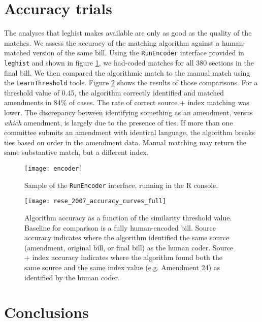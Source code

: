 \documentclass[11pt]{article}
\begin{document}
\section{Accuracy trials}
\label{sec:accuracy-trials}

The analyses that leghist makes available are only as good as the
quality of the matches. We assess the accuracy of the matching
algorithm against a human-matched version of the same bill. Using the 
\texttt{RunEncoder} interface provided in \texttt{leghist} and shown
in figure \ref{fig:encoder-interface}, we had-coded matches for all
380 sections in the final bill. We then compared the algorithmic match
to the manual match using the \texttt{LearnThreshold}
tools. Figure \ref{fig:rese-accuracy-test} shows the results of those
comparisons. For a threshold value of 0.45, the algorithm correctly
identified and matched amendments in 84\% of cases. The rate of
correct source + index matching was lower. The discrepancy between
identifying something as an amendment, versus \textit{which}
amendment, is largely due to the presence of ties. If
more than one committee submits an amendment with identical language,
the algorithm breaks ties based on order in the amendment data. Manual
matching may return the same substantive match, but a different
index.


\begin{figure}[ht]
  \centering
  \texttt{[image: encoder]}
  \caption{Sample of the \texttt{RunEncoder} interface, running in the R console. }
  \label{fig:encoder-interface}
\end{figure}

\begin{figure}[ht]
  \centering
  \texttt{[image: rese\_2007\_accuracy\_curves\_full]}
  \caption{Algorithm accuracy as a function of the similarity threshold value. Baseline for comparison is a fully human-encoded bill. Source accuracy indicates where the algorithm identified the same source (amendment, original bill, or final bill) as the human coder. Source + index accuracy indicates where the algorithm found both the same source and the same index value (e.g. Amendment 24) as identified by the human coder.  }
  \label{fig:rese-accuracy-test}
\end{figure}


\section{Conclusions}
\label{sec:conclusions}
\end{document}
